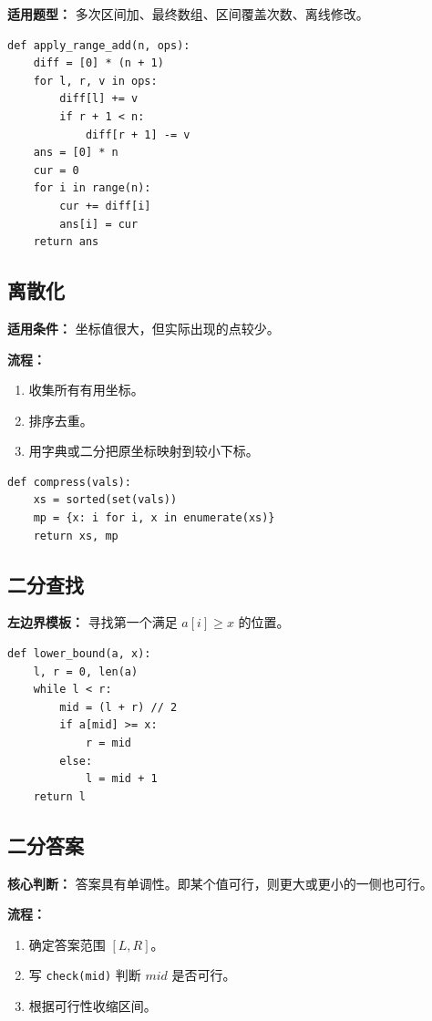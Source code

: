 \documentclass[UTF8,a4paper,14pt]{ctexart}
\begin{document}
\textbf{适用题型：}
多次区间加、最终数组、区间覆盖次数、离线修改。

\begin{lstlisting}
def apply_range_add(n, ops):
    diff = [0] * (n + 1)
    for l, r, v in ops:
        diff[l] += v
        if r + 1 < n:
            diff[r + 1] -= v
    ans = [0] * n
    cur = 0
    for i in range(n):
        cur += diff[i]
        ans[i] = cur
    return ans
\end{lstlisting}

\subsection{离散化}

\textbf{适用条件：}
坐标值很大，但实际出现的点较少。

\textbf{流程：}
\begin{enumerate}
  \item 收集所有有用坐标。
  \item 排序去重。
  \item 用字典或二分把原坐标映射到较小下标。
\end{enumerate}

\begin{lstlisting}
def compress(vals):
    xs = sorted(set(vals))
    mp = {x: i for i, x in enumerate(xs)}
    return xs, mp
\end{lstlisting}

\subsection{二分查找}

\textbf{左边界模板：}
寻找第一个满足 $a[i]\ge x$ 的位置。

\begin{lstlisting}
def lower_bound(a, x):
    l, r = 0, len(a)
    while l < r:
        mid = (l + r) // 2
        if a[mid] >= x:
            r = mid
        else:
            l = mid + 1
    return l
\end{lstlisting}

\subsection{二分答案}

\textbf{核心判断：}
答案具有单调性。即某个值可行，则更大或更小的一侧也可行。

\textbf{流程：}
\begin{enumerate}
  \item 确定答案范围 $[L,R]$。
  \item 写 \texttt{check(mid)} 判断 $mid$ 是否可行。
  \item 根据可行性收缩区间。
\end{enumerate}
\end{document}

